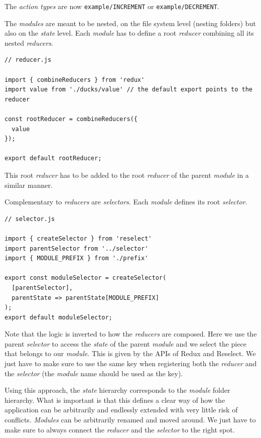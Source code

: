 The \emph{action types} are now \texttt{example/INCREMENT} or \texttt{example/DECREMENT}.

The \emph{modules} are meant to be nested, on the file system level (nesting folders) but also on the \emph{state} level.  Each \emph{module} has to define a root \emph{reducer} combining all its nested \emph{reducers}.

\begin{verbatim}
// reducer.js

import { combineReducers } from 'redux'
import value from './ducks/value' // the default export points to the reducer

const rootReducer = combineReducers({
  value
});

export default rootReducer;
\end{verbatim}

This root \emph{reducer} has to be added to the root \emph{reducer} of the parent \emph{module} in a similar manner. 

Complementary to \emph{reducers} are \emph{selectors}. Each \emph{module} defines its root \emph{selector}.

\begin{verbatim}
// selector.js

import { createSelector } from 'reselect'
import parentSelector from '../selector'
import { MODULE_PREFIX } from './prefix'

export const moduleSelector = createSelector(
  [parentSelector],
  parentState => parentState[MODULE_PREFIX]
);
export default moduleSelector;
\end{verbatim}

Note that the logic is inverted to how the \emph{reducers} are composed. Here we use the parent \emph{selector} to access the \emph{state} of the parent \emph{module} and we select the piece that belongs to our \emph{module}. This is given by the APIs of Redux and Reselect. We just have to make sure to use the same key when registering both the \emph{reducer} and the \emph{selector} (the \emph{module} name should be used as the key).

Using this approach, the \emph{state} hierarchy corresponds to the \emph{module} folder hierarchy. What is important is that this defines a clear way of how the application can be arbitrarily and endlessly extended with very little risk of conflicts. \emph{Modules} can be arbitrarily renamed and moved around. We just have to make sure to always connect the \emph{reducer} and the \emph{selector} to the right spot.

